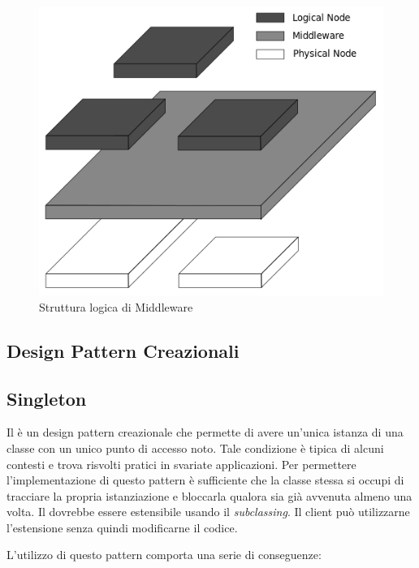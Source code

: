 \begin{figure}[H]
\centering \includegraphics[width=\textwidth]{patterns/Middleware.png}
\caption{Struttura logica di Middleware}
\label{fig:middleware}
\end{figure}

\subsection{Design Pattern Creazionali}

\subsection{Singleton}

Il  è un design pattern creazionale che permette di avere un'unica istanza di una classe con un unico punto di accesso noto. Tale condizione è tipica di alcuni contesti e trova risvolti pratici in svariate applicazioni. Per permettere l'implementazione di questo pattern è sufficiente che la classe stessa si occupi di tracciare la propria istanziazione e bloccarla qualora sia già avvenuta almeno una volta. Il  dovrebbe essere estensibile usando il \emph{subclassing}. Il client può utilizzarne l'estensione senza quindi modificarne il codice.
	
L'utilizzo di questo pattern comporta una serie di conseguenze:

